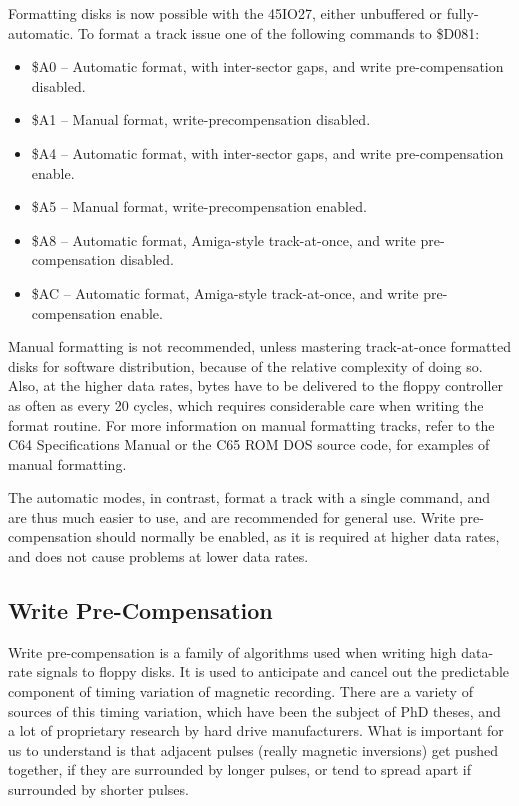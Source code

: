 \begin{enumerate}
Formatting disks is now possible with the 45IO27, either unbuffered or fully-automatic.
To format a track issue one of the following commands to \$D081:

\begin{itemize}
\item \$A0 -- Automatic format, with inter-sector gaps, and write pre-compensation disabled.
\item \$A1 -- Manual format, write-precompensation disabled.
\item \$A4 -- Automatic format, with inter-sector gaps, and write pre-compensation enable.
\item \$A5 -- Manual format, write-precompensation enabled.
\item \$A8 -- Automatic format, Amiga-style track-at-once, and write pre-compensation disabled.
\item \$AC -- Automatic format, Amiga-style track-at-once, and write pre-compensation enable.
\end{itemize}  
  
Manual formatting is not recommended, unless mastering track-at-once formatted disks for software
distribution, because of the relative complexity of doing so. Also, at the higher data rates,
bytes have to be delivered to the floppy controller as often as every 20 cycles, which requires
considerable care when writing the format routine.
For more information on manual formatting tracks, refer to the C64 Specifications Manual or the
C65 ROM DOS source code, for examples of manual formatting.

The automatic modes, in contrast, format a track with a single command, and are thus much easier to use,
and are recommended for general use.  Write pre-compensation should normally be enabled, as it is
required at higher data rates, and does not cause problems at lower data rates.

\subsection{Write Pre-Compensation}

Write pre-compensation is a family of algorithms used when writing high data-rate signals to floppy disks.
It is used to anticipate and cancel out the predictable component of timing variation of magnetic recording.
There are a variety of sources of this timing variation, which have been the subject of PhD theses, and a
lot of proprietary research by hard drive manufacturers.  What is important for us to understand is that adjacent
pulses (really magnetic inversions) get pushed together, if they are surrounded by longer pulses, or tend to
spread apart if surrounded by shorter pulses.


\end{enumerate}
